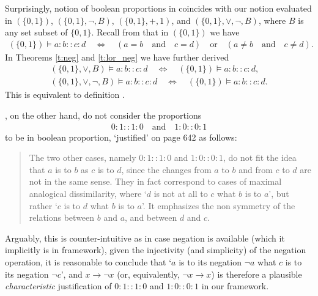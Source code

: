 \documentclass[11pt]{amsart}
\theoremstyle{definition} %
\begin{document}
Surprisingly,  notion of boolean proportions in  coincides with our notion evaluated in $(\{0,1\})$, $(\{0,1\},\neg,B)$, $(\{0,1\},+,1)$, and $(\{0,1\},\lor,\neg,B)$, where $B$ is any set subset of $\{0,1\}$. Recall from  that in $(\{0,1\})$ we have
\begin{align*} 
	(\{0,1\})\models a:b::c:d \quad\Leftrightarrow\quad (a=b \quad\text{and}\quad c=d) \quad\text{or}\quad (a\neq b \quad\text{and}\quad c\neq d).
\end{align*} In Theorems \ref{t:neg} and \ref{t:lor_neg} we have further derived
\begin{align*}
	(\{0,1\},\lor,B)\models a:b::c:d \quad\Leftrightarrow\quad (\{0,1\})\models a:b::c:d,\\
	(\{0,1\},\lor,\neg,B)\models a:b::c:d \quad\Leftrightarrow\quad (\{0,1\})\models a:b::c:d.
\end{align*} This is equivalent to  definition . 

, on the other hand, do not consider the proportions
\begin{align*} 
	0:1::1:0 \quad\text{and}\quad 1:0::0:1
\end{align*} to be in boolean proportion, `justified' on page 642 as follows:
\begin{quote} 
	The two other cases, namely $0:1::1:0$ and $1:0::0:1$, do not fit the idea that $a$ is to $b$ as $c$ is to $d$, since the changes from $a$ to $b$ and from $c$ to $d$ are not in the same sense. They in fact correspond to cases of maximal analogical dissimilarity, where `$d$ is not at all to $c$ what $b$ is to $a$', but rather `$c$ is to $d$ what $b$ is to $a$'. It emphasizes the non symmetry of the relations between $b$ and $a$, and between $d$ and $c$.
\end{quote} Arguably, this is counter-intuitive as in case negation is available (which it implicitly is in  framework), given the injectivity (and simplicity) of the negation operation, it is reasonable to conclude that `$a$ is to its negation $\neg a$ what $c$ is to its negation $\neg c$', and $x\to\neg x$ (or, equivalently, $\neg x\to x$) is therefore a plausible \textit{characteristic} justification of $0:1::1:0$ and $1:0::0:1$ in our framework. %

\vspace*{0.5cm}
\end{document}
